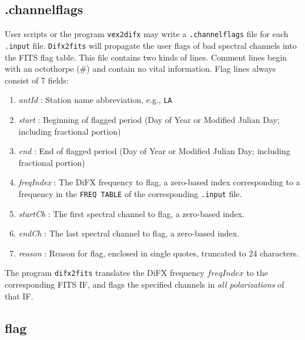
\subsection{.channelflags} \label{sec:dotchannelflags}

User scripts or the program {\tt vex2difx} may write a {\tt .channelflags} file for each {\tt .input} file.
{\tt Difx2fits} will propagate the user flags of bad spectral channels into the FITS flag table.
This file contains two kinds of lines.
Comment lines begin with an octothorpe (\#) and contain no vital information.
Flag lines always consist of 7 fields:
\begin{enumerate}
\item {\em antId} : Station name abbreviation, e.g., {\tt LA}
\item {\em start} : Beginning of flagged period (Day of Year or Modified Julian Day; including fractional portion)
\item {\em end} : End of flagged period (Day of Year or Modified Julian Day; including fractional portion)
\item {\em freqIndex} : The DiFX frequency to flag, a zero-based index corresponding to a frequency in the {\tt FREQ TABLE} of the corresponding {\tt .input} file.
\item {\em startCh} : The first spectral channel to flag, a zero-based index.
\item {\em endCh} : The last spectral channel to flag, a zero-based index.
\item {\em reason} : Reason for flag, enclosed in single quotes, truncated to 24 characters.
\end{enumerate}
The program {\tt difx2fits} translates the DiFX frequency $freqIndex$ to the corresponding FITS IF, and flags the specified channels in {\em all polarizations} of that IF.



\subsection{flag} \label{sec:flag}

